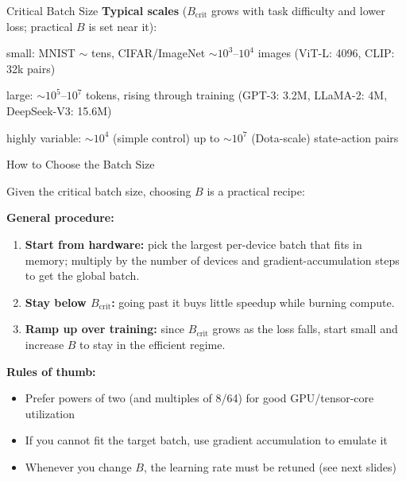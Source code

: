 \begin{frame}{Critical Batch Size}
  \medskip
  \textbf{Typical scales} ($B_{\text{crit}}$ grows with task difficulty and lower loss; practical $B$ is set near it):
  \begin{description}[labelwidth=\widthof{\bfseries Vision~~}, leftmargin=!]
    \item[Vision] small: MNIST $\sim$ tens, CIFAR/ImageNet $\sim 10^3$--$10^4$ images (ViT-L: 4096, CLIP: 32k pairs)
    \item[LLM] large: $\sim 10^5$--$10^7$ tokens, rising through training (GPT-3: 3.2M, LLaMA-2: 4M, DeepSeek-V3: 15.6M)
    \item[RL] highly variable: $\sim 10^4$ (simple control) up to $\sim 10^7$ (Dota-scale) state-action pairs
  \end{description}
\end{frame}

\begin{frame}{How to Choose the Batch Size}

  Given the critical batch size, choosing $B$ is a practical recipe:

  \vspace{0.4em}
  \textbf{General procedure:}
  \begin{enumerate}
    \item \textbf{Start from hardware:} pick the largest per-device batch that fits in memory; multiply by the number of devices and gradient-accumulation steps to get the global batch.
    \item \textbf{Stay below $B_{\text{crit}}$:} going past it buys little speedup while burning compute.
    \item \textbf{Ramp up over training:} since $B_{\text{crit}}$ grows as the loss falls, start small and increase $B$ to stay in the efficient regime.
  \end{enumerate}

  \vspace{0.3em}
  \textbf{Rules of thumb:}
  \begin{itemize}
    \item Prefer powers of two (and multiples of 8/64) for good GPU/tensor-core utilization
    \item If you cannot fit the target batch, use gradient accumulation to emulate it
    \item Whenever you change $B$, the learning rate must be retuned (see next slides)
  \end{itemize}

\end{frame}

